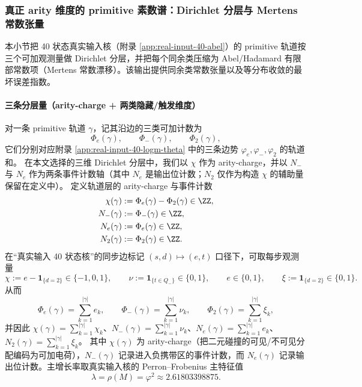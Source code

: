 \subsubsection{真正 arity 维度的 primitive 素数谱：Dirichlet 分层与 Mertens 常数张量}\label{subsec:arity-dirichlet-mertens-tensor}
本小节把 40 状态真实输入核（附录 \ref{app:real-input-40-abel}）的 primitive 轨道按三个可加观测量做 Dirichlet 分层，并把每个同余类压缩为 Abel/Hadamard 有限部常数项（Mertens 常数漂移）。该输出提供同余类常数张量以及等分布收敛的最坏误差指数。

\paragraph{三条分层量（arity-charge + 两类隐藏/触发维度）}
对一条 primitive 轨道 $\gamma$，记其沿边的三类可加计数为
$$
\Phi_e(\gamma),\qquad \Phi_-(\gamma),\qquad \Phi_2(\gamma),
$$
它们分别对应附录 \ref{app:real-input-40-logm-theta} 中的三条边势 $\varphi_e,\varphi_-,\varphi_2$ 的轨道和。
在本文选择的三维 Dirichlet 分层中，我们以 $\chi$ 作为 arity-charge，并以 $N_-$ 与 $N_e$ 作为两条事件计数轴（其中 $N_e$ 是输出位计数；$N_2$ 仅作为构造 $\chi$ 的辅助量保留在定义中）。
定义轨道层的 arity-charge 与事件计数
\[
\begin{aligned}
\chi(\gamma)&:=\Phi_e(\gamma)-\Phi_2(\gamma)\in\ZZ,\\
N_-(\gamma)&:=\Phi_-(\gamma)\in\ZZ,\\
N_e(\gamma)&:=\Phi_e(\gamma)\in\ZZ,\\
N_2(\gamma)&:=\Phi_2(\gamma)\in\ZZ.
\end{aligned}
\]
在“真实输入 40 状态核”的同步边标记 $(s,d)\mapsto(e,t)$ 口径下，可取每步观测量
$$
\chi:=e-\mathbf{1}_{\{d=2\}}\in\{-1,0,1\},
\qquad
\nu:=\mathbf{1}_{\{t\in Q_-\}}\in\{0,1\},
\qquad
e\in\{0,1\},
\qquad
\xi:=\mathbf{1}_{\{d=2\}}\in\{0,1\}.
$$
从而
$$
\Phi_e(\gamma)=\sum_{k=1}^{|\gamma|} e_k,
\qquad
\Phi_-(\gamma)=\sum_{k=1}^{|\gamma|} \nu_k,
\qquad
\Phi_2(\gamma)=\sum_{k=1}^{|\gamma|} \xi_k,
$$
并因此 $\chi(\gamma)=\sum_{k=1}^{|\gamma|}\chi_k$、$N_-(\gamma)=\sum_{k=1}^{|\gamma|}\nu_k$、$N_e(\gamma)=\sum_{k=1}^{|\gamma|}e_k$、$N_2(\gamma)=\sum_{k=1}^{|\gamma|}\xi_k$。
其中 $\chi(\gamma)$ 为 arity-charge（把二元碰撞的可见/不可见分配编码为可加电荷），$N_-(\gamma)$ 记录进入负携带区的事件计数，而 $N_e(\gamma)$ 记录输出位计数。主增长率取真实输入核的 Perron--Frobenius 主特征值
$$
\lambda=\rho(M)=\varphi^2\approx 2.61803398875.
$$


